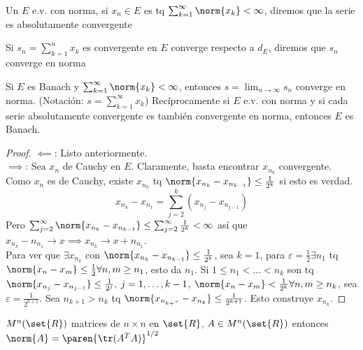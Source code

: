 \documentclass{notetaking}
\begin{document}
\begin{defn}
    Un \(E\) e.v. con norma, si \(x_n\in E\) es tq \(\sum_{k=1}^\infty\norm{x_k}<\infty\), diremos que la serie es absolutamente convergente
\end{defn}
\begin{defn}
    Si \(s_n=\sum_{k=1}^nx_k\) es convergente en \(E\) converge respecto a \(d_E\), diremos que \(s_n\) converge en norma
\end{defn}
\begin{prp}
    Si \(E\) es Banach y \(\sum_{k=1}^\infty\norm{x_k}<\infty\), entonces \(s=\lim_{n\rightarrow\infty}s_n\) converge en norma. (Notación: \(s=\sum_{k=1}^\infty x_k\)) Recíprocamente si \(E\) e.v. con norma y si cada serie absolutamente convergente es también convergente en norma, entonces \(E\) es Banach.
\end{prp}
\begin{proof}
    \(\impliedby\): Listo anteriormente.\\
    \(\implies\): Sea \(x_n\) de Cauchy en \(E\). Claramente, basta encontrar \(x_{n_k}\) convergente.\\
    Como \(x_n\) es de Cauchy, existe \(x_{n_k}\) tq \(\norm{x_{n_k}-x_{n_{k-1}}}\leq\frac1{2^k}\) si esto es verdad.
    \[
        x_{n_k}-x_{n_1}=\sum_{j=2}^k(x_{n_j}-x_{n_{j-1}})
    \]
    Pero \(\sum_{j=2}^\infty\norm{x_{n_k}-x_{n_{k-1}}}\leq\sum_{j=2}^\infty\frac1{2^k}<\infty\) así que \(x_{n_k}-n_{n_1}\rightarrow x\implies x_{n_k}\rightarrow x+n_{n_1}\).\\
    Para ver que \(\exists x_{n_k}\) con \(\norm{x_{n_k}-x_{n_{k-1}}}\leq\frac1{2^k}\), sea \(k=1\), para \(\varepsilon=\frac12\exists n_1\) tq \(\norm{x_n-x_m}\leq\frac12\forall n,m\geq n_1\), esto da \(n_1\). Si \(1\leq n_1<\dots<n_k\) son tq \(\norm{x_{n_j}-x_{n_{j-1}}}\leq\frac1{2^j},\: j=1,\dots,k-1\), \(\norm{x_n-x_m}<\frac1{2^k}\forall n,m\geq n_k\), sea \(\varepsilon=\frac1{2^{k+1}}\). Sea \(n_{k+1}>n_k\) tq \(\norm{x_{n_{k+`'}}-x_{n_{k}}}\leq\frac1{2^{k+1}}\). Esto construye \(x_{n_k}\).
\end{proof}
\begin{ejm}
    \(M^n(\set{R})\) matrices de \(n\times n\) en \(\set{R}\), \(A\in M^n(\set{R})\) entonces \(\norm{A}=\paren{\tr(A^TA)}^{1/2}\)
\end{ejm}
\end{document}
